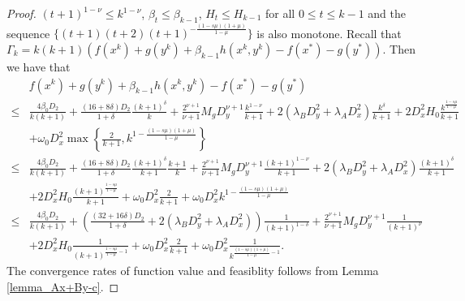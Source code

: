 \documentclass{article}
\numberwithin{equation}{section}
\begin{document}
\begin{proof}
    $(t+1)^{1-\nu} \leq k^{1-\nu}$, $\beta_t \leq \beta_{k-1}$, $H_t\leq H_{k-1}$ for all $0\leq t\leq k-1$ 
    and the sequence $\{(t+1)(t+2)(t+1)^{-\frac{(1-s\mu)(1+\mu)}{1-\mu}}\}$ is also monotone. 
    Recall that $\Gamma_k = k(k+1)(f(x^k)+g(y^k)+\beta_{k-1}h(x^k,y^k)-f(x^*)-g(y^*))$. Then we have that
    \begin{align}
        &f(x^k)+g(y^k)+\beta_{k-1}h(x^k,y^k)-f(x^*)-g(y^*) \nonumber \\
        \leq& \frac{4\beta_0D_2}{k(k+1)}+\frac{(16+8\delta)D_2}{1+\delta}\frac{(k+1)^{\delta}}{k}
        +\frac{2^{\nu+1}}{\nu+1}M_gD_y^{\nu+1}\frac{k^{1-\nu}}{k+1}+2(\lambda_BD_y^2+\lambda_AD_x^2)\frac{k^{\delta}}{k+1} 
        +2D_x^2H_0\frac{k^{\frac{1-s\mu}{1-\mu}}}{k+1} \nonumber \\
        &+ \omega_0D_x^2\max\left\{\frac{2}{k+1}, k^{1-\frac{(1-s\mu)(1+\mu)}{1-\mu}}\right\} \nonumber \\
        \leq & \frac{4\beta_0D_2}{k(k+1)}+\frac{(16+8\delta)D_2}{1+\delta}\frac{(k+1)^{\delta}}{k+1}\frac{k+1}{k}
        +\frac{2^{\nu+1}}{\nu+1}M_gD_y^{\nu+1}\frac{(k+1)^{1-\nu}}{k+1}+2(\lambda_BD_y^2+\lambda_AD_x^2)\frac{(k+1)^{\delta}}{k+1} 
         \nonumber \\
        &+2D_x^2H_0\frac{(k+1)^{\frac{1-s\mu}{1-\mu}}}{k+1}+ \omega_0D_x^2\frac{2}{k+1}+\omega_0D_x^2k^{1-\frac{(1-s\mu)(1+\mu)}{1-\mu}}  \nonumber \\
        \leq & \frac{4\beta_0D_2}{k(k+1)}+\left(\frac{(32+16\delta)D_2}{1+\delta}+2(\lambda_BD_y^2+\lambda_AD_x^2)\right)\frac{1}{(k+1)^{1-\delta}}
        +\frac{2^{\nu+1}}{\nu+1}M_gD_y^{\nu+1}\frac{1}{(k+1)^{\nu}}     \nonumber \\
        &+2D_x^2H_0\frac{1}{(k+1)^{\frac{1-s\mu}{1-\mu}-1}}+ \omega_0D_x^2\frac{2}{k+1}+\omega_0D_x^2\frac{1}{k^{\frac{(1-s\mu)(1+\mu)}{1-\mu}-1}}.  \nonumber
    \end{align}
    The convergence rates of function value and feasiblity follows from Lemma \ref{lemma_Ax+By-c}. 


\end{proof}
\end{document}
